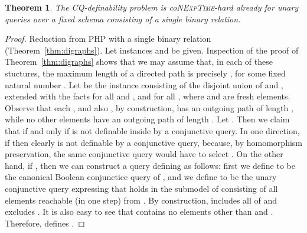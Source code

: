 \documentclass{article}
\newtheorem{theorem}{Theorem}
\newcommand{\nexptime}{\textsc{NExpTime}\xspace}
\begin{document}
\begin{theorem}
 The CQ-definability problem is
  co\nexptime-hard already for unary queries over a fixed schema
  consisting of a single binary relation. 
\end{theorem}



\begin{proof}
 Reduction from PHP with a single binary relation 
  (Theorem~\ref{thm:digraphs}).  Let instances 
  and  be given. Inspection of the proof of
  Theorem~\ref{thm:digraphs} shows that we may assume that, in each
  of these stuctures, the maximum length of a directed path is precisely ,
  for some fixed natural number .  Let  be the instance consisting
  of the disjoint union of  and , extended with
  the facts  for all  and , and 
  for all , where  and  are fresh
  elements. Observe that each , and also , by construction, has an outgoing
  path of length , while no other elements have an outgoing
  path of length .
  Let .  Then we claim that  if and
  only if  is not definable inside  by a conjunctive query. In one direction,
  if  then clearly  is not
  definable by a conjunctive query, because, by homomorphism preservation, the same
  conjunctive query would have to select .  On the other hand, if 
  , then we can
  construct a query  defining  as follows: first we define 
  to be the canonical Boolean  conjunctice query of , and we define  to be the unary conjunctive query
  expressing that  holds in the submodel of  consisting of
  all elements reachable (in one step) from . By
  construction,   includes all of  and excludes . It
  is also easy to see that  contains no elements other than
   and . Therefore,  defines . 
\end{proof}






\end{document}

